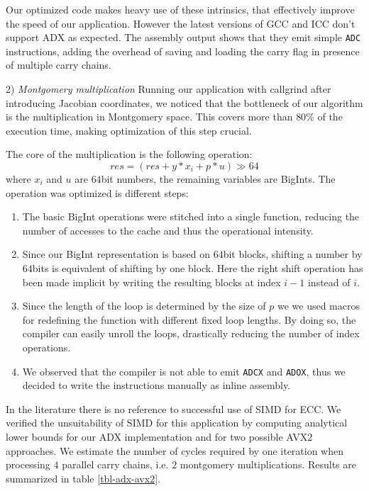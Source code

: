 Our optimized code makes heavy use of these intrinsics, that effectively improve the speed of our application. However the latest versions of GCC and ICC don't support ADX as expected. The assembly output shows that they emit simple \texttt{ADC} instructions, adding the overhead of saving and loading the carry flag in presence of multiple carry chains.

2) \emph{Montgomery multiplication}
Running our application with callgrind after introducing Jacobian coordinates, we noticed that the bottleneck of our algorithm is the multiplication in Montgomery space. This covers more than $80\%$ of the execution time, making optimization of this step crucial.
 
The core of the multiplication is the following operation:
$$res = \left(res + y * x_i + p * u\right) \gg 64$$
where $x_i$ and $u$ are $64$bit numbers, the remaining variables are BigInts. The operation was optimized is different steps:
\begin{enumerate}
\item The basic BigInt operations were stitched into a single function, reducing the number of accesses to the cache and thus the operational intensity.
\item Since our BigInt representation is based on $64$bit blocks, shifting a number by $64$bits is equivalent of shifting by one block. Here the right shift operation has been made implicit by writing the resulting blocks at index $i-1$ instead of $i$.
\item Since the length of the loop is determined by the size of $p$ we we used macros for redefining the function with different fixed loop lengths. By doing so, the compiler can easily unroll the loops, drastically reducing the number of index operations. 
\item We observed that the compiler is not able to emit \texttt{ADCX} and \texttt{ADOX}, thus we decided to write the instructions manually as inline assembly. 
\end{enumerate}

In the literature there is no reference to successful use of SIMD for ECC. We verified the unsuitability of SIMD for this application by computing analytical lower bounds for our ADX implementation and for two possible AVX2 approaches.
We estimate the number of cycles required by one iteration when processing $4$ parallel carry chains, i.e. $2$ montgomery multiplications. Results are summarized in table \ref{tbl-adx-avx2}.

